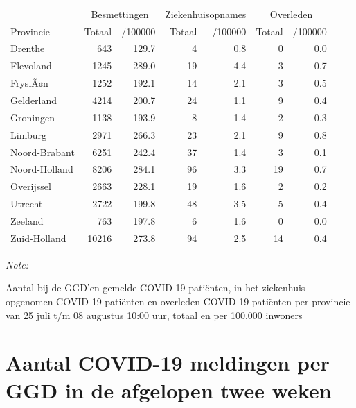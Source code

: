 \documentclass[
  english,
  man,floatsintext]{apa6}
\begin{document}
\begin{table}
\centering
\begin{threeparttable}
\begin{tabular}{lrrrrrr}
\toprule
\multicolumn{1}{c}{ } & \multicolumn{2}{c}{Besmettingen} & \multicolumn{2}{c}{Ziekenhuisopnames} & \multicolumn{2}{c}{Overleden} \\
\cmidrule(l{3pt}r{3pt}){2-3} \cmidrule(l{3pt}r{3pt}){4-5} \cmidrule(l{3pt}r{3pt}){6-7}
Provincie & Totaal & /100000 & Totaal & /100000 & Totaal & /100000\\
\midrule
Drenthe & 643 & 129.7 & 4 & 0.8 & 0 & 0.0\\
Flevoland & 1245 & 289.0 & 19 & 4.4 & 3 & 0.7\\
FryslÃ¢n & 1252 & 192.1 & 14 & 2.1 & 3 & 0.5\\
Gelderland & 4214 & 200.7 & 24 & 1.1 & 9 & 0.4\\
Groningen & 1138 & 193.9 & 8 & 1.4 & 2 & 0.3\\
Limburg & 2971 & 266.3 & 23 & 2.1 & 9 & 0.8\\
Noord-Brabant & 6251 & 242.4 & 37 & 1.4 & 3 & 0.1\\
Noord-Holland & 8206 & 284.1 & 96 & 3.3 & 19 & 0.7\\
Overijssel & 2663 & 228.1 & 19 & 1.6 & 2 & 0.2\\
Utrecht & 2722 & 199.8 & 48 & 3.5 & 5 & 0.4\\
Zeeland & 763 & 197.8 & 6 & 1.6 & 0 & 0.0\\
Zuid-Holland & 10216 & 273.8 & 94 & 2.5 & 14 & 0.4\\
\bottomrule
\end{tabular}
\begin{tablenotes}
\item \textit{Note: } 
\item Aantal bij de GGD’en gemelde COVID-19 patiënten, in het ziekenhuis opgenomen COVID-19 patiënten en overleden COVID-19 patiënten per provincie van 25 juli t/m 08 augustus 10:00 uur, totaal en per 100.000 inwoners
\end{tablenotes}
\end{threeparttable}
\end{table}

\newpage

\hypertarget{aantal-covid-19-meldingen-per-ggd-in-de-afgelopen-twee-weken}{%
\section{Aantal COVID-19 meldingen per GGD in de afgelopen twee weken}\label{aantal-covid-19-meldingen-per-ggd-in-de-afgelopen-twee-weken}}
\end{document}
